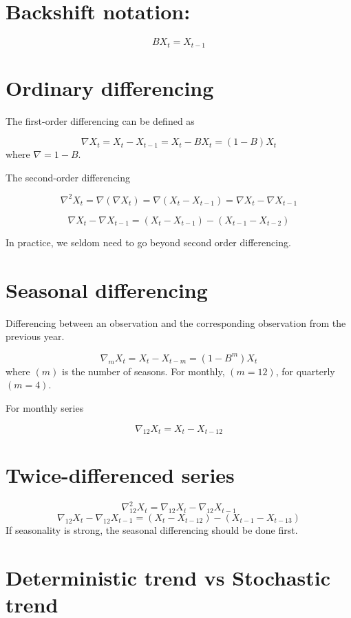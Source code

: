 \documentclass[
  11pt,
  a4paper,
]{report}
\begin{document}
\section{Backshift notation:}\label{backshift-notation}

\[BX_t=X_{t-1}\]

\section{Ordinary differencing}\label{ordinary-differencing}

The first-order differencing can be defined as

\[\nabla X_t = X_t-X_{t-1}=X_t-BX_t=(1-B)X_t\] where \(\nabla=1-B\).

The second-order differencing

\[\nabla^2X_t=\nabla(\nabla X_t)=\nabla(X_t-X_{t-1})=\nabla X_t - \nabla X_{t-1}\]

\[\nabla X_t - \nabla X_{t-1}=(X_t-X_{t-1})-(X_{t-1}-X_{t-2})\]

In practice, we seldom need to go beyond second order differencing.

\section{Seasonal differencing}\label{seasonal-differencing}

Differencing between an observation and the corresponding observation
from the previous year.

\[\nabla_mX_t=X_t-X_{t-m}=(1-B^m)X_t\] where \((m)\) is the number of
seasons. For monthly, \((m=12)\), for quarterly \((m=4)\).

For monthly series

\[\nabla_{12}X_t=X_t-X_{t-12}\]

\section{Twice-differenced series}\label{twice-differenced-series}

\[\nabla^2_{12}X_t=\nabla_{12}X_t-\nabla_{12}X_{t-1}\]
\[\nabla_{12}X_t-\nabla_{12}X_{t-1}=(X_t-X_{t-12})-(X_{t-1}-X_{t-13})\]
If seasonality is strong, the seasonal differencing should be done
first.

\section{Deterministic trend vs Stochastic
trend}\label{deterministic-trend-vs-stochastic-trend}
\end{document}
